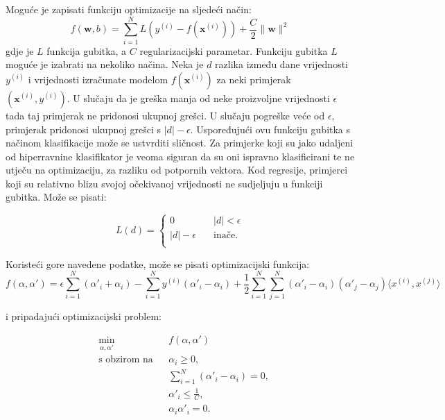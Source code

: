 \documentclass[times, utf8, zavrsni, numeric]{fer}
\begin{document}
Moguće je zapisati funkciju optimizacije na sljedeći način:
\begin{equation}
  f(\mathbf{w}, b) = \sum_{i=1}^{N}L(y^{(i)} - f(\mathbf{x}^{(i)})) + 
  \frac{C}{2}\|\mathbf{w}\|^2
\end{equation}
gdje je $L$ funkcija gubitka, a $C$ regularizacijski parametar. 
Funkciju gubitka $L$ moguće je izabrati na nekoliko načina. 
Neka je $d$ razlika između dane vrijednosti $y^{(i)}$ i vrijednosti izračunate modelom $f(\mathbf{x}^{(i)})$
za neki primjerak $(\mathbf{x}^{(i)}, y^{(i)})$. 
U slučaju da je greška manja od neke proizvoljne vrijednosti $\epsilon$ tada taj primjerak ne pridonosi
ukupnoj grešci. 
U slučaju pogreške veće od $\epsilon$, primjerak pridonosi ukupnoj grešci s $|d| - \epsilon$.
Uspoređujući ovu funkciju gubitka s načinom klasifikacije može se ustvrditi sličnost.
Za primjerke koji su jako udaljeni od hiperravnine klasifikator je veoma siguran da su oni ispravno 
klasificirani te ne utječu na optimizaciju, za razliku od potpornih vektora. 
Kod regresije, primjerci koji su relativno blizu svojoj očekivanoj vrijednosti ne sudjeljuju u funkciji 
gubitka. Može se pisati:

\begin{equation}
  L(d) = 
  \begin{cases}
    0 & \quad |d| < \epsilon\\
    |d| - \epsilon & \quad \text{inače}.\\
  \end{cases}
\end{equation}

Koristeći gore navedene podatke, može se pisati optimizacijski funkcija:
\begin{equation*}
  f(\alpha, \alpha') = \epsilon \sum_{i=1}^{N} (\alpha'_i + \alpha_i) - 
  \sum_{i=1}^{N} y^{(i)}(\alpha'_i - \alpha_i) + \frac{1}{2}\sum_{i=1}^{N}\sum_{j=1}^{N}
(\alpha'_i - \alpha_i)(\alpha'_j - \alpha_j)\langle x^{(i)},x^{(j)} \rangle
\end{equation*}

i pripadajući optimizacijski problem:

\begin{equation}
\begin{aligned}
& \underset{\alpha, \alpha'}{\text{min}}
& & f(\alpha, \alpha')\\
& \text{s obzirom na}
& & \alpha_i \geq 0, \\
&&& \sum_{i=1}^{N} (\alpha'_i - \alpha_i) = 0,\\
&&& \alpha'_i \leq \frac{1}{C},\\
&&& \alpha_i\alpha'_i = 0.
\end{aligned}
\end{equation}
\end{document}

